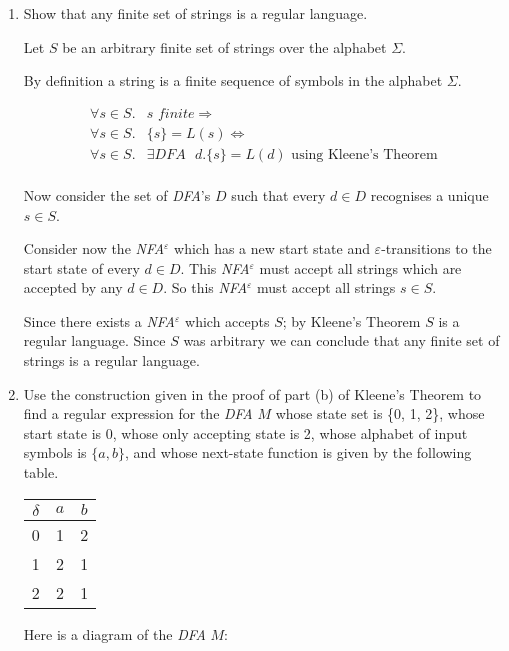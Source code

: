 \documentclass[10pt,\jkfside,a4paper]{article}
\newcommand{\dfa}{\textit{DFA} }
\newcommand{\nfae}{\textit{NFA}$^\varepsilon$ }
\begin{document}
\begin{enumerate}
\item Show that any finite set of strings is a regular language.

Let $S$ be an arbitrary finite set of strings over the alphabet $\Sigma$.

By definition a string is a finite sequence of symbols in the alphabet $\Sigma$.

\[
\begin{split}
\forall s \in S.& s \textit{ finite} \Longrightarrow \\
\forall s \in S.& \{s\} = L(s) \Longleftrightarrow \\
\forall s \in S.& \exists \dfa \text{ } d. \{s\} = L(d) \text{ using Kleene's Theorem} \\
\end{split}
\]

Now consider the set of \textit{DFA}'s $D$ such that every $d \in D$ recognises a unique 
$s \in S$.

Consider now the \nfae which has a new start state and $\varepsilon$-transitions to 
the start state of every $d \in D$. This \nfae must accept all strings which are accepted 
by any $d \in D$. So this \nfae must accept all strings $s \in S$.

Since there exists a \nfae which accepts $S$; by Kleene’s Theorem $S$ is a regular language.
Since $S$ was arbitrary we can conclude that any finite set of strings is a regular language.

\item Use the construction given in the proof of part (b) of Kleene’s Theorem to find
a regular expression for the \dfa $M$ whose state set is \{0, 1, 2\}, whose start state is 0, whose
only accepting state is 2, whose alphabet of input symbols is $\{a, b\}$, and whose next-state
function is given by the following table.

\begin{center}
\begin{tabular}{c|c c}
$\delta$ & $a$ & $b$ \\
\hline
0 & 1 & 2 \\
1 & 2 & 1 \\
2 & 2 & 1 \\
\end{tabular}
\end{center}

Here is a diagram of the \dfa $M$:


\end{enumerate}
\end{document}
